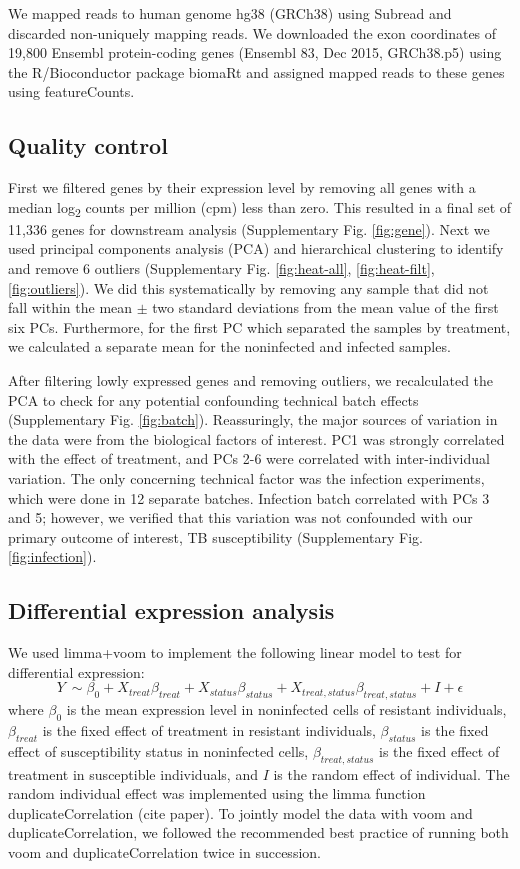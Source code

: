 \documentclass[fleqn,10pt]{wlscirep}
\begin{document}
We mapped reads to human genome hg38 (GRCh38) using Subread and
discarded non-uniquely mapping reads. We downloaded the exon
coordinates of 19,800 Ensembl protein-coding genes (Ensembl 83, Dec
2015, GRCh38.p5) using the R/Bioconductor package biomaRt and assigned
mapped reads to these genes using featureCounts.
\subsection*{Quality control}

First we filtered genes by their expression level by removing all
genes with a median log\textsubscript{2} counts per million (cpm) less
than zero. This resulted in a final set of 11,336 genes for downstream
analysis (Supplementary Fig. \ref{fig:gene}). Next we used principal
components analysis (PCA) and hierarchical clustering to identify and
remove 6 outliers (Supplementary Fig. \ref{fig:heat-all},
\ref{fig:heat-filt}, \ref{fig:outliers}). We did this systematically
by removing any sample that did not fall within the mean $\pm$ two
standard deviations from the mean value of the first six PCs.
Furthermore, for the first PC which separated the samples by
treatment, we calculated a separate mean for the noninfected and
infected samples.

After filtering lowly expressed genes and removing outliers, we
recalculated the PCA to check for any potential confounding technical
batch effects (Supplementary Fig. \ref{fig:batch}). Reassuringly, the
major sources of variation in the data were from the biological
factors of interest. PC1 was strongly correlated with the effect of
treatment, and PCs 2-6 were correlated with inter-individual
variation. The only concerning technical factor was the infection
experiments, which were done in 12 separate batches. Infection batch
correlated with PCs 3 and 5; however, we verified that this variation
was not confounded with our primary outcome of interest, TB
susceptibility (Supplementary Fig. \ref{fig:infection}).
\subsection*{Differential expression analysis}

We used limma+voom \cite{Smyth2004, Law2014, Ritchie2015} to implement
the following linear model to test for differential expression:
\begin{equation} \label{eq:limma}
Y\ \sim \beta_{0} + X_{treat}\beta_{treat} + X_{status}\beta_{status} + X_{treat,status}\beta_{treat,status} + I + \epsilon
\end{equation}
where $\beta_{0}$ is the mean expression level in noninfected cells of
resistant individuals, $\beta_{treat}$ is the fixed effect of
treatment in resistant individuals, $\beta_{status}$ is the fixed
effect of susceptibility status in noninfected cells,
$\beta_{treat,status}$ is the fixed effect of treatment in susceptible
individuals, and $I$ is the random effect of individual. The random
individual effect was implemented using the limma function
duplicateCorrelation (cite paper). To jointly model the data with voom
and duplicateCorrelation, we followed the recommended best practice of
running both voom and duplicateCorrelation twice in succession.
\end{document}
